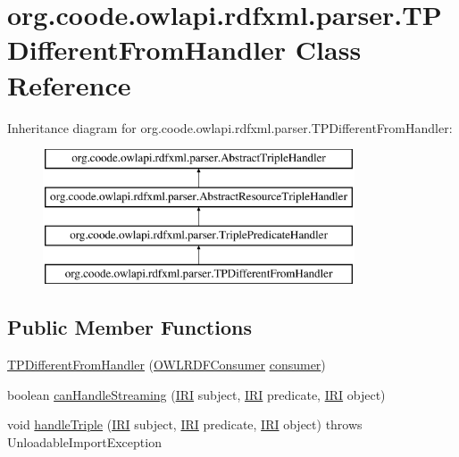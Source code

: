\hypertarget{classorg_1_1coode_1_1owlapi_1_1rdfxml_1_1parser_1_1_t_p_different_from_handler}{\section{org.\-coode.\-owlapi.\-rdfxml.\-parser.\-T\-P\-Different\-From\-Handler Class Reference}
\label{classorg_1_1coode_1_1owlapi_1_1rdfxml_1_1parser_1_1_t_p_different_from_handler}
}
Inheritance diagram for org.\-coode.\-owlapi.\-rdfxml.\-parser.\-T\-P\-Different\-From\-Handler\-:\begin{figure}[H]
\begin{center}
\leavevmode
\includegraphics[height=4.000000cm]{classorg_1_1coode_1_1owlapi_1_1rdfxml_1_1parser_1_1_t_p_different_from_handler}
\end{center}
\end{figure}
\subsection*{Public Member Functions}
\begin{DoxyCompactItemize}
\item 
\hyperlink{classorg_1_1coode_1_1owlapi_1_1rdfxml_1_1parser_1_1_t_p_different_from_handler_ac5328601f5b3df1a1b5cfe3ac2be610f}{T\-P\-Different\-From\-Handler} (\hyperlink{classorg_1_1coode_1_1owlapi_1_1rdfxml_1_1parser_1_1_o_w_l_r_d_f_consumer}{O\-W\-L\-R\-D\-F\-Consumer} \hyperlink{classorg_1_1coode_1_1owlapi_1_1rdfxml_1_1parser_1_1_abstract_triple_handler_a4ccf4d898ff01eb1cadfa04b23d54e9c}{consumer})
\item 
boolean \hyperlink{classorg_1_1coode_1_1owlapi_1_1rdfxml_1_1parser_1_1_t_p_different_from_handler_a8343abc39ed105453eaa785d482b2a89}{can\-Handle\-Streaming} (\hyperlink{classorg_1_1semanticweb_1_1owlapi_1_1model_1_1_i_r_i}{I\-R\-I} subject, \hyperlink{classorg_1_1semanticweb_1_1owlapi_1_1model_1_1_i_r_i}{I\-R\-I} predicate, \hyperlink{classorg_1_1semanticweb_1_1owlapi_1_1model_1_1_i_r_i}{I\-R\-I} object)
\item 
void \hyperlink{classorg_1_1coode_1_1owlapi_1_1rdfxml_1_1parser_1_1_t_p_different_from_handler_a0103cc3344748ceb8f762bc14964762f}{handle\-Triple} (\hyperlink{classorg_1_1semanticweb_1_1owlapi_1_1model_1_1_i_r_i}{I\-R\-I} subject, \hyperlink{classorg_1_1semanticweb_1_1owlapi_1_1model_1_1_i_r_i}{I\-R\-I} predicate, \hyperlink{classorg_1_1semanticweb_1_1owlapi_1_1model_1_1_i_r_i}{I\-R\-I} object)  throws Unloadable\-Import\-Exception 
\end{DoxyCompactItemize}
